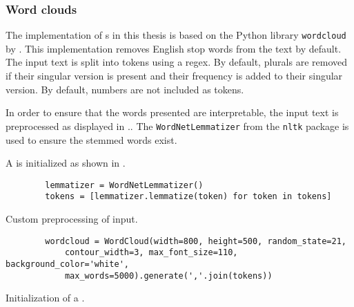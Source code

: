 \subsubsection*{Word clouds}\label{subsubsec:impl-wordcloud}

The implementation of \wordcloud{}s in this thesis is based on the Python library \texttt{wordcloud} by \citeauthor{wordcloud-dev} \cite{wordcloud-dev}.
This implementation removes English stop words from the text by default.
The input text is split into tokens using a regex.
By default, plurals are removed if their singular version is present and their frequency is added to their singular version.
By default, numbers are not included as tokens.

In order to ensure that the words presented are interpretable, the input text is preprocessed as displayed in ..
The \texttt{WordNetLemmatizer} from the \texttt{nltk} package is used to ensure the stemmed words exist.

A \wordcloud{} is initialized as shown in .

\begin{listing}[htp]
    \begin{verbatim}
        lemmatizer = WordNetLemmatizer()
        tokens = [lemmatizer.lemmatize(token) for token in tokens]
    \end{verbatim}
    \caption[Custom preprocessing of \wordcloud{} input]
    {Custom preprocessing of \wordcloud{} input.
    }
    \label{lst:impl-preproc-wordcloud}
\end{listing}

\begin{listing}[htp]
    \begin{verbatim}
        wordcloud = WordCloud(width=800, height=500, random_state=21, 
            contour_width=3, max_font_size=110, background_color='white', 
            max_words=5000).generate(','.join(tokens))
    \end{verbatim}
    \caption[Initialization of a \wordcloud{}]
    {Initialization of a \wordcloud{}.
    }
    \label{lst:impl-wordcloud}
\end{listing}

